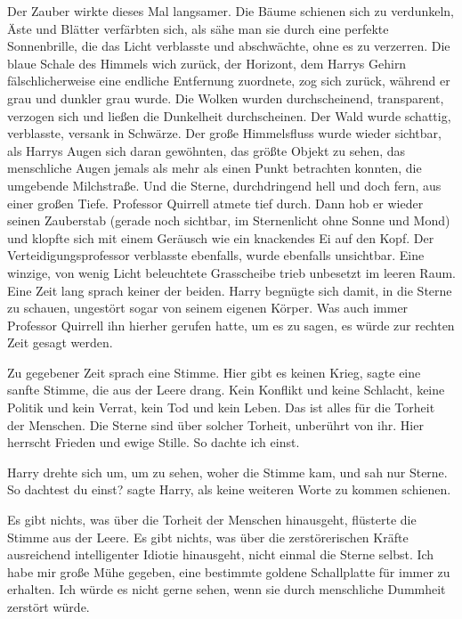 Der Zauber wirkte dieses Mal langsamer. Die Bäume schienen sich zu verdunkeln,
Äste und Blätter verfärbten sich, als sähe man sie durch eine perfekte
Sonnenbrille, die das Licht verblasste und abschwächte, ohne es zu verzerren.
Die blaue Schale des Himmels wich zurück, der Horizont, dem Harrys Gehirn
fälschlicherweise eine endliche Entfernung zuordnete, zog sich zurück, während
er grau und dunkler grau wurde. Die Wolken wurden durchscheinend, transparent,
verzogen sich und ließen die Dunkelheit durchscheinen. Der Wald wurde schattig,
verblasste, versank in Schwärze. Der große Himmelsfluss wurde wieder sichtbar,
als Harrys Augen sich daran gewöhnten, das größte Objekt zu sehen, das
menschliche Augen jemals als mehr als einen Punkt betrachten konnten, die
umgebende Milchstraße. Und die Sterne, durchdringend hell und doch fern, aus
einer großen Tiefe. Professor Quirrell atmete tief durch. Dann hob er wieder
seinen Zauberstab (gerade noch sichtbar, im Sternenlicht ohne Sonne und Mond)
und klopfte sich mit einem Geräusch wie ein knackendes Ei auf den Kopf. Der
Verteidigungsprofessor verblasste ebenfalls, wurde ebenfalls unsichtbar. Eine
winzige, von wenig Licht beleuchtete Grasscheibe trieb unbesetzt im leeren Raum.
Eine Zeit lang sprach keiner der beiden. Harry begnügte sich damit, in die
Sterne zu schauen, ungestört sogar von seinem eigenen Körper. Was auch immer
Professor Quirrell ihn hierher gerufen hatte, um es zu sagen, es würde zur
rechten Zeit gesagt werden.

Zu gegebener Zeit sprach eine Stimme. \glqq{}Hier gibt es keinen Krieg\grqq{},
sagte eine sanfte Stimme, die aus der Leere drang. \glqq{}Kein Konflikt und keine
Schlacht, keine Politik und kein Verrat, kein Tod und kein Leben. Das ist alles
für die Torheit der Menschen. Die Sterne sind über solcher Torheit, unberührt
von ihr. Hier herrscht Frieden und ewige Stille. So dachte ich einst.\grqq{}

Harry drehte sich um, um zu sehen, woher die Stimme kam, und sah nur Sterne.
\glqq{}So dachtest du einst?\grqq{} sagte Harry, als keine weiteren Worte zu
kommen schienen.

\glqq{}Es gibt nichts, was über die Torheit der Menschen hinausgeht\grqq{},
flüsterte die Stimme aus der Leere. \glqq{}Es gibt nichts, was über die
zerstörerischen Kräfte ausreichend intelligenter Idiotie hinausgeht, nicht
einmal die Sterne selbst. Ich habe mir große Mühe gegeben, eine bestimmte
goldene Schallplatte für immer zu erhalten. Ich würde es nicht gerne sehen, wenn
sie durch menschliche Dummheit zerstört würde.\grqq{}

